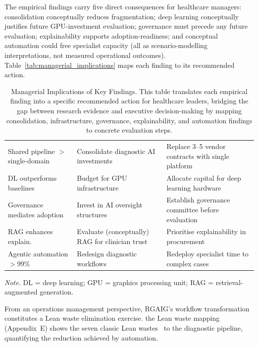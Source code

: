 The empirical findings carry five direct consequences for healthcare managers: consolidation conceptually reduces fragmentation; deep learning conceptually justifies future GPU-investment evaluation; governance must precede any future evaluation; explainability supports adoption-readiness; and conceptual automation could free specialist capacity (all as scenario-modelling interpretations, not measured operational outcomes). Table~\ref{tab:managerial_implications} maps each finding to its recommended action.

\begin{table}[H]
\tablestripes\tablefontsize
\tablefontsize
\caption[Managerial Implications of Key Findings]{Managerial Implications of Key Findings. This table translates each empirical finding into a specific recommended action for healthcare leaders, bridging the gap between research evidence and executive decision-making by mapping consolidation, infrastructure, governance, explainability, and automation findings to concrete evaluation steps.}
\begin{tabularx}{\textwidth}{@{} >{\raggedright\arraybackslash}p{2.5cm} L L @{}}
\toprule
{} &  &  \\
\midrule
Shared pipeline $>$ single-domain & Consolidate diagnostic AI investments & Replace 3--5 vendor contracts with single platform \\
DL outperforms baselines & Budget for GPU infrastructure & Allocate capital for deep learning hardware \\
Governance mediates adoption & Invest in AI oversight structures & Establish governance committee before evaluation \\
RAG enhances explain. & Evaluate (conceptually) RAG for clinician trust & Prioritise explainability in procurement \\
Agentic automation $>$99\% & Redesign diagnostic workflows & Redeploy specialist time to complex cases \\
\bottomrule
\end{tabularx}
\vspace{0.5em}\noindent\textit{Note.} DL = deep learning; GPU = graphics processing unit; RAG = retrieval-augmented generation.
\end{table}

\noindent From an operations management perspective, RGAIG's workflow transformation constitutes a Lean waste elimination exercise. the Lean waste mapping (Appendix~E) shows the seven classic Lean wastes~\cite{womack1996lean} to the diagnostic pipeline, quantifying the reduction achieved by automation.

